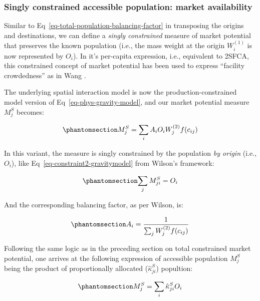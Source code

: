 \documentclass[
  10pt,
  letterpaper,
]{article}
\begin{document}
\subsubsection{Singly constrained accessible population: market
availability}\label{singly-constrained-accessible-population-market-availability}

Similar to Eq~\ref{eq-total-population-balancing-factor} in transposing
the origins and destinations, we can define a \emph{singly constrained}
measure of market potential that preserves the known population (i.e.,
the mass weight at the origin \(W_i^{(1)}\) is now represented by
\(O_i\)). In it's per-capita expression, i.e., equivalent to 2SFCA, this
constrained concept of market potential has been used to express
``facility crowdedness'' as in Wang \citep{wang_inverted_2018}.

The underlying spatial interaction model is now the
production-constrained model version of Eq~\ref{eq-phys-gravity-model},
and our market potential measure \(M^S_j\) becomes:

\begin{equation}\phantomsection\label{eq-population-constrained-accessibility}{
M^S_j = \sum_i A_i O_i W_j^{(2)} f(c_{ij})
}\end{equation}

In this variant, the measure is singly constrained by the population
\emph{by origin} (i.e., \(O_i\)), like
Eq~\ref{eq-constraint2-gravitymodel} from Wilson's framework:

\begin{equation}\phantomsection\label{eq-population-constraint}{
\sum_j M^S_{ji} =  O_i 
}\end{equation}

And the corresponding balancing factor, as per Wilson, is:

\begin{equation}\phantomsection\label{eq-population-constrained-proportionality-constants}{
A_i = \frac{1}{\sum_j W_j^{(2)} f(c_{ij})}
}\end{equation}

Following the same logic as in the preceding section on total
constrained market potential, one arrives at the following expression of
accessible population \(M_j^S\) being the product of proportionally
allocated (\(\hat \kappa^S_{ji}\)) popultion:

\begin{equation}\phantomsection\label{eq-production-constrained-accessibility-with-proportional-allocation-factor}{
M^S_{j} = \sum_i \hat \kappa^S_{ji} O_i
}\end{equation}
\end{document}
